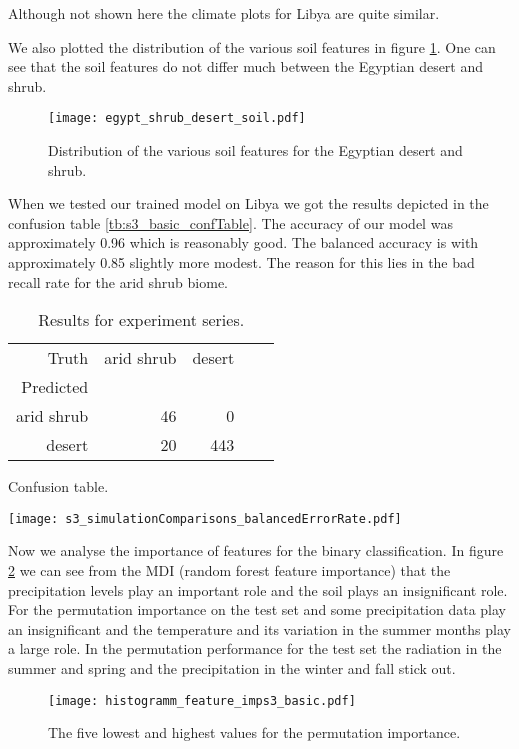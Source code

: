 Although not shown here the climate plots for Libya are quite similar.

We also plotted the distribution of the various soil features in figure \ref{pl:egypt_shrub_desert_soil}.
One can see that the soil features do not differ much between the Egyptian desert and shrub.
\begin{figure}[h]
  \centering
  \texttt{[image: egypt\_shrub\_desert\_soil.pdf]}
  \caption{Distribution of the various soil features for the Egyptian desert and shrub.}
  \label{pl:egypt_shrub_desert_soil}
\end{figure}

When we tested our trained model on Libya we got the results depicted in the confusion table 
\ref{tb:s3_basic_confTable}. The accuracy of our model was approximately 0.96 which is reasonably good. The balanced accuracy is with
approximately 0.85 slightly more modest.
The reason for this lies in the bad recall rate for the arid shrub biome.
\begin{table}[h]
  \centering
  \begin{minipage}{0.45\textwidth}
    \begin{tabular}{rrrrr}
      \toprule
      Truth & arid shrub & desert \\
      Predicted & & \\
      \midrule
      arid shrub & 46 & 0 \\
      desert & 20 & 443 \\
      \bottomrule
    \end{tabular}
    \caption{Confusion table.}
    \label{tb:s3_basic_confTable}
    
  \end{minipage}
  \hfill
  \begin{minipage}{0.45\textwidth}
    \centering
    \texttt{[image: s3\_simulationComparisons\_balancedErrorRate.pdf]}
    \caption{Results for experiment series.}
    \label{pl:s3_simulationComparisons_balancedErrorRate}
  \end{minipage}
\end{table}

Now we analyse the importance of features for the binary classification.
In figure \ref{pl:histogramm_feature_imps3_basic} we can see 
from the MDI (random forest feature importance) that
the precipitation levels play an important role and the soil plays an insignificant role.
For the permutation importance on the test set  and some precipitation data play an insignificant and 
the temperature and its variation in the
summer months play a large role. In the permutation performance 
for the test set the radiation in the summer and spring and the precipitation in the winter and fall
stick out.
\begin{figure}
  \centering
  \texttt{[image: histogramm\_feature\_imps3\_basic.pdf]}
  \caption{The five lowest and highest values for the permutation importance.}
  \label{pl:histogramm_feature_imps3_basic}
\end{figure}

